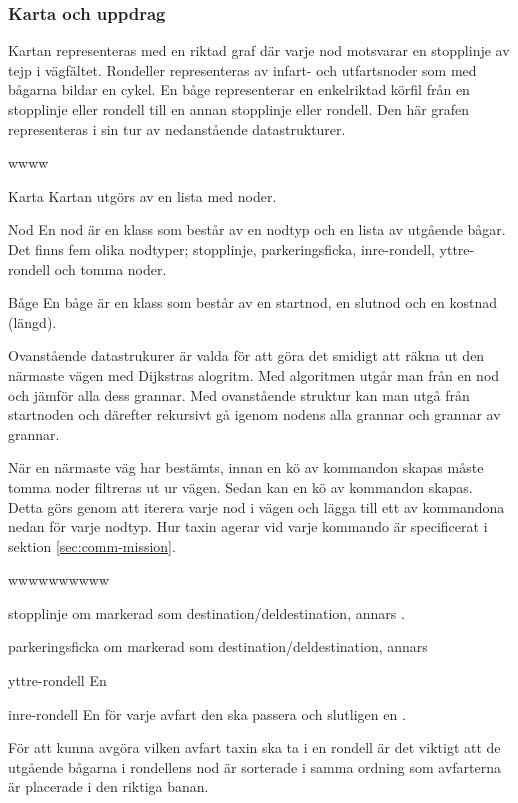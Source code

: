 \documentclass[tekniskrapport/tech.tex]{subfiles}
\begin{document}
\subsubsection{Karta och uppdrag}
\label{sec:mission}
Kartan representeras med en riktad graf där varje nod motsvarar en stopplinje
av tejp i vägfältet. Rondeller representeras av infart- och utfartsnoder som
med bågarna bildar en cykel. En båge representerar en enkelriktad körfil från
en stopplinje eller rondell till en annan stopplinje eller rondell. Den här
grafen representeras i sin tur av nedanstående datastrukturer.

\begin{labeling}{wwww}
    \item[Karta] Kartan utgörs av en lista med noder.

    \item[Nod] En nod är en klass som består av en nodtyp och en lista
        av utgående bågar. Det finns fem olika nodtyper; stopplinje,
        parkeringsficka, inre-rondell, yttre-rondell och tomma noder. 

    \item[Båge] En båge är en klass som består av en startnod, en slutnod och
    en kostnad (längd).
        
\end{labeling}
Ovanstående datastrukurer är valda för att göra det smidigt att räkna ut den
närmaste vägen med Dijkstras alogritm. Med algoritmen utgår man från en nod och
jämför alla dess grannar. Med ovanstående struktur kan man utgå från startnoden
och därefter rekursivt gå igenom nodens alla grannar och grannar av grannar.

När en närmaste väg har bestämts, innan en kö av kommandon skapas måste tomma
noder filtreras ut ur vägen. Sedan kan en kö av kommandon skapas. Detta görs
genom att iterera varje nod i vägen och lägga till ett av kommandona nedan för
varje nodtyp. Hur taxin agerar vid varje kommando är specificerat i sektion
\ref{sec:comm-mission}.

\begin{labeling}{wwwwwwwwww}
\item[stopplinje] {\commStop} om markerad som destination/deldestination,
annars \commIgnore.

\item[parkeringsficka] {\commPark} om markerad som destination/deldestination,
annars \commIgnore 

\item[yttre-rondell] En \commEnter

\item[inre-rondell] En {\commContinue} för varje
avfart den ska passera och slutligen en \commExit.

\end{labeling}
För att kunna avgöra vilken avfart taxin ska ta i en rondell är det viktigt att
de utgående bågarna i rondellens nod är sorterade i samma ordning som
avfarterna är placerade i den riktiga banan.
\end{document}
